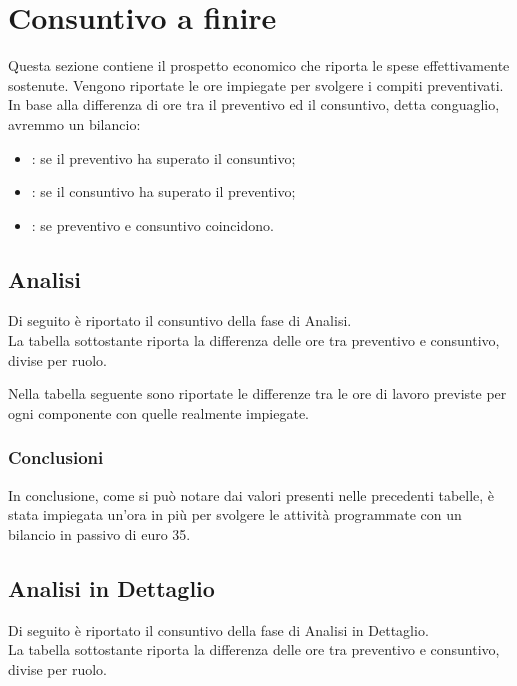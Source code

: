 \section{Consuntivo a finire}
Questa sezione contiene il prospetto economico che riporta le spese effettivamente sostenute. Vengono riportate le ore impiegate per svolgere i compiti preventivati. In base alla differenza di ore tra il preventivo ed il consuntivo, detta conguaglio, avremmo un bilancio:
\begin{itemize}
\item {}: se il preventivo ha superato il consuntivo;
\item {}: se il consuntivo ha superato il preventivo;
\item {}: se preventivo e consuntivo coincidono.
\end{itemize}
\subsection{Analisi}
Di seguito è riportato il consuntivo della fase di Analisi.\\
La tabella sottostante riporta la differenza delle ore tra preventivo e consuntivo, divise per ruolo.


Nella tabella seguente sono riportate le differenze tra le ore di lavoro previste per ogni componente con quelle realmente impiegate.


\subsubsection{Conclusioni}
In conclusione, come si può notare dai valori presenti nelle precedenti tabelle, è stata impiegata un'ora in più per svolgere le attività programmate con un bilancio in passivo di euro 35.

\subsection{Analisi in Dettaglio}
Di seguito è riportato il consuntivo della fase di Analisi in Dettaglio.\\
La tabella sottostante riporta la differenza delle ore tra preventivo e consuntivo, divise per ruolo.

